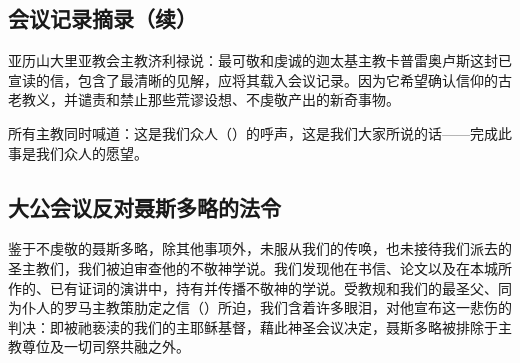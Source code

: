 
\subsection{会议记录摘录（续）}

\par

亚历山大里亚教会主教济利禄说：最可敬和虔诚的迦太基主教卡普雷奥卢斯这封已宣读的信，包含了最清晰的见解，应将其载入会议记录。因为它希望确认信仰的古老教义，并谴责和禁止那些荒谬设想、不虔敬产出的新奇事物。\par

所有主教同时喊道：这是我们众人（）的呼声，这是我们大家所说的话——完成此事是我们众人的愿望。\par

\par


\subsection{大公会议反对聂斯多略的法令}

\par

鉴于不虔敬的聂斯多略，除其他事项外，未服从我们的传唤，也未接待我们派去的圣主教们，我们被迫审查他的不敬神学说。我们发现他在书信、论文以及在本城所作的、已有证词的演讲中，持有并传播不敬神的学说。受教规和我们的最圣父、同为仆人的罗马主教策肋定之信（）所迫，我们含着许多眼泪，对他宣布这一悲伤的判决：即被祂亵渎的我们的主耶稣基督，藉此神圣会议决定，聂斯多略被排除于主教尊位及一切司祭共融之外。\par

